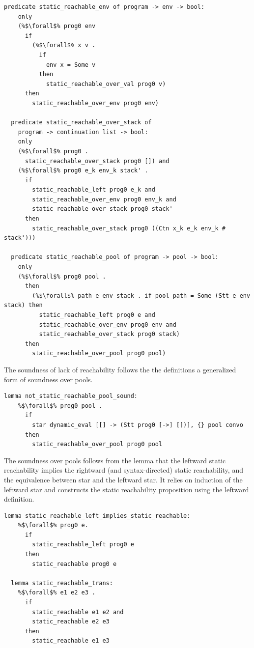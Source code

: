 \documentclass{article}
\begin{document}
\begin{lstlisting}[language=logic, escapechar=\%]
  predicate static_reachable_env of program -> env -> bool:
    only
    (%$\forall$% prog0 env
      if
        (%$\forall$% x v .
          if
            env x = Some v
          then
            static_reachable_over_val prog0 v)
      then
        static_reachable_over_env prog0 env)

  predicate static_reachable_over_stack of
    program -> continuation list -> bool:
    only
    (%$\forall$% prog0 .
      static_reachable_over_stack prog0 []) and
    (%$\forall$% prog0 e_k env_k stack' .
      if
        static_reachable_left prog0 e_k and 
        static_reachable_over_env prog0 env_k and
        static_reachable_over_stack prog0 stack' 
      then
        static_reachable_over_stack prog0 ((Ctn x_k e_k env_k # stack')))

  predicate static_reachable_pool of program -> pool -> bool:
    only
    (%$\forall$% prog0 pool .
      then
        (%$\forall$% path e env stack . if pool path = Some (Stt e env stack) then 
          static_reachable_left prog0 e and 
          static_reachable_over_env prog0 env and 
          static_reachable_over_stack prog0 stack)
      then
        static_reachable_over_pool prog0 pool)

  \end{lstlisting}

The soundness of lack of reachability follows the the definitions
a generalized form of soundness over pools.

\begin{lstlisting}[language=logic, escapechar=\%]
  lemma not_static_reachable_pool_sound:
    %$\forall$% prog0 pool .
      if
        star dynamic_eval [[] -> (Stt prog0 [->] [])], {} pool convo 
      then
        static_reachable_over_pool prog0 pool

  \end{lstlisting}


The soundness over pools follows from the lemma that the leftward
static reachability implies the rightward (and syntax-directed) static reachability,
and the equivalence between star and the leftward star.  It relies on induction of the
leftward star and constructs the static reachability
proposition using the leftward definition.  

\begin{lstlisting}[language=logic, escapechar=\%]
  lemma static_reachable_left_implies_static_reachable:
    %$\forall$% prog0 e. 
      if
        static_reachable_left prog0 e
      then
        static_reachable prog0 e

  lemma static_reachable_trans:
    %$\forall$% e1 e2 e3 .
      if 
        static_reachable e1 e2 and
        static_reachable e2 e3
      then
        static_reachable e1 e3
  \end{lstlisting}
\end{document}
